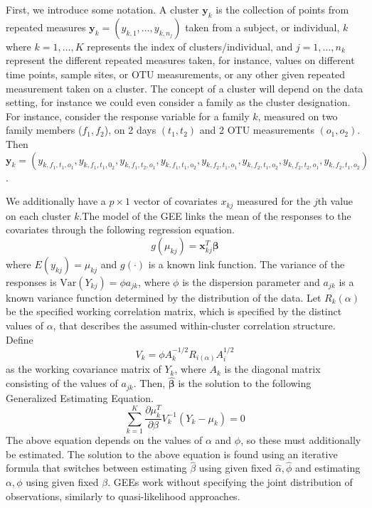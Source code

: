\documentclass[12pt]{article}
\begin{document}
First, we introduce some notation. A cluster $\mathbf{y}_k$ is the collection of points from repeated measures $\mathbf{y}_k = (y_{k,1}, \ldots , y_{k,n_j})$ taken from a subject, or individual, $k$ where $k = 1, \ldots , K$ represents the index of clusters/individual, and $j = 1, \ldots , n_k$ represent the different repeated measures taken, for instance, values on different  time points, sample sites, or OTU measurements, or any other given repeated measurement taken on a cluster.
The concept of a cluster will depend on the data setting, for instance we could even consider a family as the cluster designation. For instance, consider the response variable for a family $k$, measured on two family members ($f_1,f_2$), on 2 days $(t_1,t_2)$ and 2 OTU measurements $(o_1,o_2)$. Then $\mathbf{y}_k = (y_{k, f_1,t_1,o_1}, y_{k, f_1,t_1,0_2}, y_{k, f_1,t_2,o_1}, y_{k, f_1,t_1,o_2},y_{k, f_2,t_1,o_1}, y_{k, f_2,t_1,o_2}, y_{k, f_2,t_2,o_1}, y_{k, f_2,t_1,o_2})$.

We additionally have a $p \times 1$ vector of covariates $x_{kj}$ measured for the $j$th value on each cluster $k$.The model of the GEE links the mean of the responses to the covariates through the following regression equation.
$$g(\mu_{kj}) = \mathbf{x}_{kj}^T\boldsymbol \beta$$
where $E(y_{kj}) = \mu_{kj}$ and $g(\cdot)$ is a known link function. The variance of the responses is $\text{Var}(Y_{kj}) = \phi a_{jk}$, where $\phi$ is the dispersion parameter and $a_{jk}$ is a known variance function determined by the distribution of the data. Let $R_k(\alpha)$ be the specified working correlation matrix, which is specified by the distinct values of $\alpha$, that describes the assumed within-cluster correlation structure. Define
$$V_k = \phi A_k^{-1/2} R_{i(\alpha)}A_i^{1/2}$$ as the working covariance matrix of $Y_k$, where $A_k$ is the diagonal matrix consisting of the values of $a_{jk}$. Then, $\hat{\boldsymbol\beta}$ is the solution to the following Generalized Estimating Equation.
$$\sum_{k=1}^K \frac{\partial  \mu_k^T }{\partial \beta } V_{k}^{-1} (Y_k - \mu_k) = 0 $$
The above equation depends on the values of $\alpha$ and $\phi$, so these must additionally be estimated. The solution to the above equation is found using an iterative formula that switches between estimating $\hat\beta$ using given fixed $\hat \alpha, \hat \phi$ and estimating $\alpha,  \phi$ using given fixed $\beta$. GEEs work without specifying the joint distribution of observations, similarly to quasi-likelihood approaches.
\end{document}
